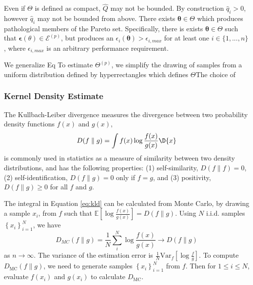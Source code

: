 Even if $\Theta$ is defined as compact, $\hat{Q}$ may not be bounded.  By construction $\hat{q}_i > 0 $, however $\hat{q}_i$ may not be bounded from above.  There exists $\bm{\theta} \in \Theta$ which produces pathological members of the Pareto set.  Specifically, there is exists $\bm{\theta} \in \Theta$ such that $\bm{\epsilon}(\theta) \in \mathcal{E}^(p)$, but produces an $\epsilon_i(\bm{\theta}) > \epsilon_{i,max}$ for at least one $i\in\{1,...,n\}$, where $\epsilon_{i,max}$ is an arbitrary performance requirement.

We generalize Eq
To estimate $\Theta^{(p)}$, we simplify the drawing of samples from a uniform distribution defined by hyperrectangles which defines $\Theta$The choice of
\subsubsection{Kernel Density Estimate}

The Kullbach-Leiber divergence\cite{kullback1997} measures the divergence between two probability density functions $f(x)$ and $g(x)$,
\begin{equation}
   \label{eq:kld}
   D(f \parallel g) = \int f(x)\log \frac{f(x)}{g(x)}\D{x}
\end{equation}
is commonly used in statistics as a measure of similarity between two density distributions, and has the following properties: (1) self-similarity, $D(f \parallel f) = 0$, (2) self-identification, $D(f \parallel g) = 0$ only if $f=g$, and (3) positivity, $D(f \parallel g) \geq 0$ for all $f$ and $g$.

The integral in Equation \ref{eq:kld} can be calculated from Monte Carlo\cite{hershey2007kld}, by drawing a sample $x_i$, from $f$ such that $\mathbb{E}\left[\log\frac{f(x)}{g(x)}\right] = D(f \parallel g)$.  Using $N$ i.i.d. samples $\left\{x_i\right\}_{i=1}^N$, we have
\begin{equation}
  \label{eq:kdmc}
  D_{MC}(f \parallel g) = \frac{1}{N}\sum_i^N \log \frac{f(x)}{g(x)}
      \rightarrow D(f \parallel g)
\end{equation}
as $n \rightarrow \infty$.  The variance of the estimation error is $\frac{1}{N}\mathrm{Var}_f\left[\log\frac{f}{g}\right]$.  To compute $D_{\mathrm{MC}}(f \parallel g)$, we need to generate samples $\left\{x_i\right\}_{i=1}^N$ from $f$.  Then for $1 \leq i \leq N$, evaluate $f(x_i)$ and $g(x_i)$ to calculate $D_{\mathrm{MC}}$.

